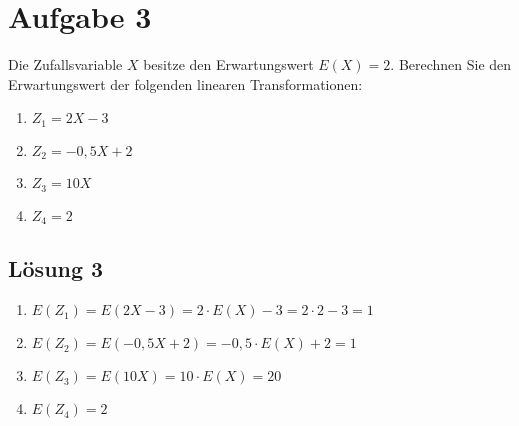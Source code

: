 \documentclass[main.tex]{subfiles}
\begin{document}
\section{Aufgabe 3}
Die Zufallsvariable $X$ besitze den Erwartungswert $E(X) = 2$. Berechnen Sie den Erwartungswert der folgenden linearen Transformationen:
\begin{enumerate}
    \item $Z_1 = 2X-3$
    \item $Z_2 = -0,5 X +2$
    \item $Z_3 = 10 X$
    \item $Z_4 = 2$
\end{enumerate}

\subsection{Lösung 3}
\begin{enumerate}
    \item $E(Z_1) = E(2X-3) = 2\cdot E(X) - 3 = 2\cdot 2 - 3 = 1$
    \item $E(Z_2) = E(-0,5 X +2) = -0,5\cdot E(X) +2 = 1$
    \item $E(Z_3) = E(10 X) = 10\cdot E(X) = 20$
    \item $E(Z_4) = 2$
\end{enumerate}
\end{document}
